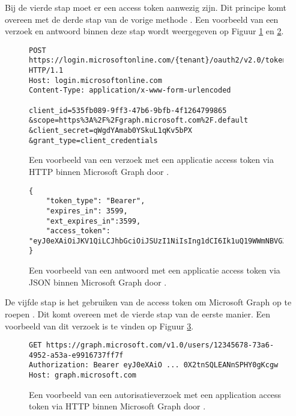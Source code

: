 Bij de vierde stap moet er een access token aanwezig zijn. Dit principe komt overeen met de derde stap van de vorige methode \autocite{Microsoft2023s}. Een voorbeeld van een verzoek en antwoord binnen deze stap wordt weergegeven op Figuur \ref{MSGATRR} en \ref{MSGATRRES}. \\

\begin{figure}[!h]
    \scriptsize
    \begin{verbatim}
POST https://login.microsoftonline.com/{tenant}/oauth2/v2.0/token HTTP/1.1
Host: login.microsoftonline.com
Content-Type: application/x-www-form-urlencoded

client_id=535fb089-9ff3-47b6-9bfb-4f1264799865
&scope=https%3A%2F%2Fgraph.microsoft.com%2F.default
&client_secret=qWgdYAmab0YSkuL1qKv5bPX
&grant_type=client_credentials 
    \end{verbatim}    
    \caption[Voorbeeld Application token Request Microsoft Graph]{Een voorbeeld van een verzoek met een applicatie access token via \ac{HTTP} binnen Microsoft Graph door \textcite{Microsoft2023s}.}
    \label{MSGATRR}
\end{figure}

\begin{figure}[!h]
    \scriptsize
    \begin{verbatim}
{
    "token_type": "Bearer",
    "expires_in": 3599,
    "ext_expires_in":3599,
    "access_token": "eyJ0eXAiOiJKV1QiLCJhbGciOiJSUzI1NiIsIng1dCI6Ik1uQ19WWmNBVGZNNXBP..."
} 
    \end{verbatim}    
    \caption[Voorbeeld Application token Response Microsoft Graph]{Een voorbeeld van een antwoord met een applicatie access token via \ac{JSON} binnen Microsoft Graph door \textcite{Microsoft2023s}.}
    \label{MSGATRRES}
\end{figure}

De vijfde stap is het gebruiken van de access token om Microsoft Graph op te roepen \autocite{Microsoft2023s}. Dit komt overeen met de vierde stap van de eerste manier. Een voorbeeld van dit verzoek is te vinden op Figuur \ref{MSGAAT}.

\begin{figure}[!h]
    \scriptsize
    \begin{verbatim}
GET https://graph.microsoft.com/v1.0/users/12345678-73a6-4952-a53a-e9916737ff7f
Authorization: Bearer eyJ0eXAiO ... 0X2tnSQLEANnSPHY0gKcgw
Host: graph.microsoft.com
    \end{verbatim}    
    \caption[Voorbeeld Application autorisatieverzoek Microsoft Graph]{Een voorbeeld van een autorisatieverzoek met een application access token via \ac{HTTP} binnen Microsoft Graph door \textcite{Microsoft2023s}.}
    \label{MSGAAT}
\end{figure}



